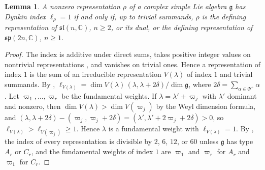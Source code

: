 \documentclass[leqno,10pt]{amsart}
\newtheorem{lemma}[theorem]{Lemma}%
\theoremstyle{definition}
\numberwithin{equation}{section}
\renewcommand{\sp}{\mathfrak{sp}}
\newcommand{\al}{\alpha}
\newcommand{\sll}{\mathfrak{sl}}
\newcommand{\g}{\mathfrak{g}}
\newcommand{\com}{\mathbb C}
\begin{document}
\begin{lemma}\label{lem:indexone}
A nonzero representation $\rho$ of a complex simple Lie algebra $\g$ has Dynkin index $\ell_{\rho} = 1$ if and only if, up to trivial summands, $\rho$ is the defining representation of $\sll(n, \com)$, $n \geq 2$, or its dual, or the defining representation of $\sp(2n, \com)$, $n \geq 1$.
\end{lemma}
\begin{proof}
The index is additive under direct sums, takes positive integer values on nontrivial representations \cite[Theorem~2.2]{Dynkin-semisimplesubalgebras}, and vanishes on trivial ones. Hence a representation of index $1$ is the sum of an irreducible representation $V(\lambda)$ of index $1$ and trivial summands. By \cite[Theorem~2.5]{Dynkin-semisimplesubalgebras}, $\ell_{V(\lambda)} = \dim V(\lambda)\,(\lambda, \lambda + 2\delta)/\dim \g$, where $2\delta = \sum_{\al \in \Phi^{+}}\al$. Let $\varpi_{1}, \dots, \varpi_{r}$ be the fundamental weights. If $\lambda = \lambda' + \varpi_{j}$ with $\lambda'$ dominant and nonzero, then $\dim V(\lambda) > \dim V(\varpi_{j})$ by the Weyl dimension formula, and $(\lambda, \lambda + 2\delta) - (\varpi_{j}, \varpi_{j} + 2\delta) = (\lambda', \lambda' + 2\varpi_{j} + 2\delta) > 0$, so $\ell_{V(\lambda)} > \ell_{V(\varpi_{j})} \geq 1$. Hence $\lambda$ is a fundamental weight with $\ell_{V(\lambda)} = 1$. By \cite[Proposition~2.6]{Laszlo-Sorger}, the index of every representation is divisible by $2$, $6$, $12$, or $60$ unless $\g$ has type $A_{r}$ or $C_{r}$, and the fundamental weights of index $1$ are $\varpi_{1}$ and $\varpi_{r}$ for $A_{r}$ and $\varpi_{1}$ for $C_{r}$.
\end{proof}
\end{document}
